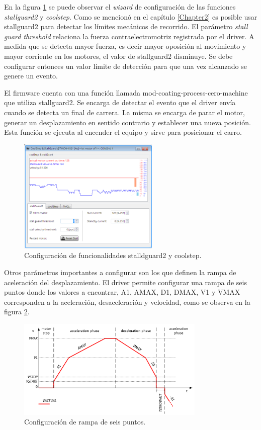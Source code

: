 En la figura \ref{fig:tmcl_ide_stall} se puede observar el \textit{wizard} de configuración de las funciones \textit{stallguard2} y \textit{coolstep}.
Como se mencionó en el capítulo \ref{Chapter2} es posible usar stallguard2 para detectar los límites mecánicos de recorrido. El parámetro \textit{stall guard threshold} relaciona la fuerza contraelectromotriz registrada por el driver. A medida que se detecta mayor fuerza, es decir mayor oposición al movimiento y mayor corriente en los motores, el valor de stallguard2 disminuye. Se debe configurar entonces un valor límite de detección para que una vez alcanzado se genere un evento.

El firmware cuenta con una función llamada mod-coating-process-cero-machine que utiliza stallguard2. Se encarga de detectar el evento que el driver envía cuando se detecta un final de carrera. La misma se encarga de parar el motor, generar un desplazamiento en sentido contrario y establecer una nueva posición. Esta función se ejecuta al encender el equipo y sirve para posicionar el carro.
 

\begin{figure}[h!]
	\centering
	\includegraphics[width=0.6\textwidth]{./Figures/tmcl_ide_2.png}
	\caption{Configuración de funcionalidades stalldguard2 y coolstep.}
	\label{fig:tmcl_ide_stall}
\end{figure}

Otros parámetros importantes a configurar son los que definen la rampa de aceleración del desplazamiento. El driver permite configurar una rampa de seis puntos donde los valores a encontrar, A1, AMAX, D1, DMAX, V1 y VMAX corresponden a la aceleración, desaceleración y velocidad, como se observa en la figura \ref{fig:rampa}.

\begin{figure}[h!]
	\centering
	\includegraphics[width=0.8\textwidth]{./Figures/rampa_1.png}
	\caption{Configuración de rampa de seis puntos.}
	\label{fig:rampa}
\end{figure}


